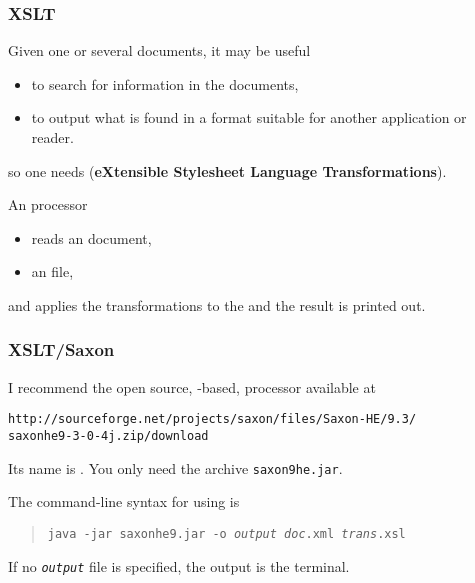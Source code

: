 %
\begin{frame}
\frametitle{XSLT}

Given one or several \XML documents, it may be useful
\begin{itemize}

  \item to search for information in the documents,

  \item to output what is found in a format suitable for another
    application or reader.

\end{itemize}
so one needs \XSLT (\textbf{eXtensible Stylesheet Language
  Transformations}).

\bigskip

An \XSLT processor 
\begin{itemize}

  \item reads an \XML document,

  \item an \XSLT file,

\end{itemize}
and applies the transformations to the \XML and the result is printed
out.

\end{frame}

%
\begin{frame}[containsverbatim]
\frametitle{XSLT/Saxon}

I recommend the open source, \Java-based, \XSLT processor available at
\begin{verbatim}
http://sourceforge.net/projects/saxon/files/Saxon-HE/9.3/
saxonhe9-3-0-4j.zip/download
\end{verbatim}
Its name is \Saxon. You only need the archive \texttt{saxon9he.jar}.

\bigskip

The command-line syntax for using \Saxon is
\begin{quote}
\texttt{java -jar saxonhe9.jar -o \emph{output} \emph{doc}.xml
  \emph{trans}.xsl}
\end{quote}
If no \texttt{\emph{output}} file is specified, the output is the
terminal.

\end{frame}


